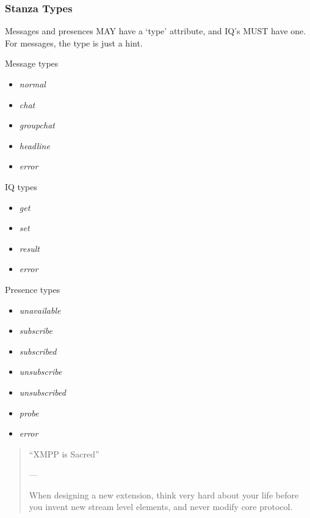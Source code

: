 \documentclass[xelatex,aspectratio=169]{beamer}
\begin{document}
\begin{frame}
	\frametitle{Stanza Types}
	\begin{flushleft}
		Messages and presences MAY have a `type' attribute, and IQ's MUST have one.
		For messages, the type is just a hint.
	\end{flushleft}
	\begin{multicols}{3}
		Message types
		\begin{itemize}
			\item\textit{normal}
			\item\textit{chat}
			\item\textit{groupchat}
			\item\textit{headline}
			\item\textit{error}
		\end{itemize}
		\columnbreak
		IQ types
		\begin{itemize}
			\item\textit{get}
			\item\textit{set}
			\item\textit{result}
			\item\textit{error}
		\end{itemize}
		\columnbreak
		Presence types
		\begin{itemize}
			\item\textit{unavailable}
			\item\textit{subscribe}
			\item\textit{subscribed}
			\item\textit{unsubscribe}
			\item\textit{unsubscribed}
			\item\textit{probe}
			\item\textit{error}
		\end{itemize}
	\end{multicols}
\end{frame}

\begin{frame}
\begin{quotation}
``XMPP is Sacred''
\begin{flushright}
---
\end{flushright}
\vspace*{2em}
When designing a new extension, think very hard about your life before you
invent new stream level elements, and never modify core protocol.
\end{quotation}
\end{frame}
\end{document}

